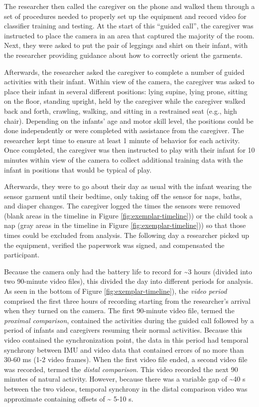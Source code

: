 \documentclass[
  man]{apa6}
\begin{document}
The researcher then called the caregiver on the phone and walked them through a set of procedures needed to properly set up the equipment and record video for classifier training and testing. At the start of this ``guided call'', the caregiver was instructed to place the camera in an area that captured the majority of the room. Next, they were asked to put the pair of leggings and shirt on their infant, with the researcher providing guidance about how to correctly orient the garments.

Afterwards, the researcher asked the caregiver to complete a number of guided activities with their infant. Within view of the camera, the caregiver was asked to place their infant in several different positions: lying supine, lying prone, sitting on the floor, standing upright, held by the caregiver while the caregiver walked back and forth, crawling, walking, and sitting in a restrained seat (e.g., high chair). Depending on the infants' age and motor skill level, the positions could be done independently or were completed with assistance from the caregiver. The researcher kept time to ensure at least 1 minute of behavior for each activity. Once completed, the caregiver was then instructed to play with their infant for 10 minutes within view of the camera to collect additional training data with the infant in positions that would be typical of play.

Afterwards, they were to go about their day as usual with the infant wearing the sensor garment until their bedtime, only taking off the sensor for naps, baths, and diaper changes. The caregiver logged the times the sensors were removed (blank areas in the timeline in Figure \ref{fig:exemplar-timeline})) or the child took a nap (gray areas in the timeline in Figure \ref{fig:exemplar-timeline})) so that those times could be excluded from analysis. The following day a researcher picked up the equipment, verified the paperwork was signed, and compensated the participant.

Because the camera only had the battery life to record for \textasciitilde3 hours (divided into two 90-minute video files), this divided the day into different periods for analysis. As seen in the bottom of Figure \ref{fig:exemplar-timeline}), the \emph{video period} comprised the first three hours of recording starting from the researcher's arrival when they turned on the camera. The first 90-minute video file, termed the \emph{proximal comparison}, contained the activities during the guided call followed by a period of infants and caregivers resuming their normal activities. Because this video contained the synchronization point, the data in this period had temporal synchrony between IMU and video data that contained errors of no more than 30-60 ms (1-2 video frames). When the first video file ended, a second video file was recorded, termed the \emph{distal comparison}. This video recorded the next 90 minutes of natural activity. However, because there was a variable gap of \textasciitilde40 s between the two videos, temporal synchrony in the distal comparison video was approximate containing offsets of \textasciitilde{} 5-10 s.
\end{document}
